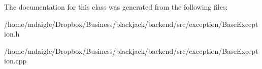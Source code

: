 \-The documentation for this class was generated from the following files\-:\begin{DoxyCompactItemize}
\item 
/home/mdaigle/\-Dropbox/\-Business/blackjack/backend/src/exception/\-Base\-Exception.\-h\item 
/home/mdaigle/\-Dropbox/\-Business/blackjack/backend/src/exception/\-Base\-Exception.\-cpp\end{DoxyCompactItemize}
